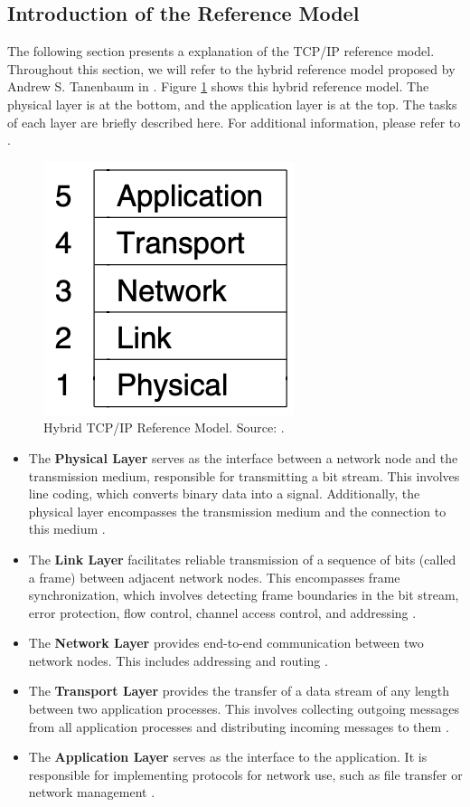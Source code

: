 \subsection{Introduction of the Reference Model}

The following section presents a explanation of the TCP/IP reference model. Throughout this section, we will refer to the hybrid reference model proposed by Andrew S. Tanenbaum in \cite{Tanenbaum2010}. Figure \ref{fig:RefModel} shows this hybrid reference model. The physical layer is at the bottom, and the application layer is at the top. The tasks of each layer are briefly described here. For additional information, please refer to \cite{Tanenbaum2010}.

\begin{figure}[h]
    \centering
    \includegraphics[width=0.25\linewidth]{figures/tcpip_refmodel/image3.png}
    \caption[Hybrid TCP/IP Reference Model]{Hybrid TCP/IP Reference Model. Source: \cite{Tanenbaum2010}.}
    \label{fig:RefModel}
\end{figure}
	
	
\begin{itemize}
\item The \textbf{Physical Layer} serves as the interface between a network node and the transmission medium, responsible for transmitting a bit stream. This involves line coding, which converts binary data into a signal. Additionally, the physical layer encompasses the transmission medium and the connection to this medium \cite{Tanenbaum2010, Weigel2021}.
\item The \textbf{Link Layer} facilitates reliable transmission of a sequence of bits (called a frame) between adjacent network nodes. This encompasses frame synchronization, which involves detecting frame boundaries in the bit stream, error protection, flow control, channel access control, and addressing \cite{Weigel2021}.
\item The \textbf{Network Layer} provides end-to-end communication between two network nodes. This includes addressing and routing \cite{Tanenbaum2010, Weigel2021}.
\item The \textbf{Transport Layer} provides the transfer of a data stream of any length between two application processes. This involves collecting outgoing messages from all application processes and distributing incoming messages to them \cite{Weigel2021}.
\item The \textbf{Application Layer} serves as the interface to the application. It is responsible for implementing protocols for network use, such as file transfer or network management \cite{Weigel2021}.
\end{itemize}



